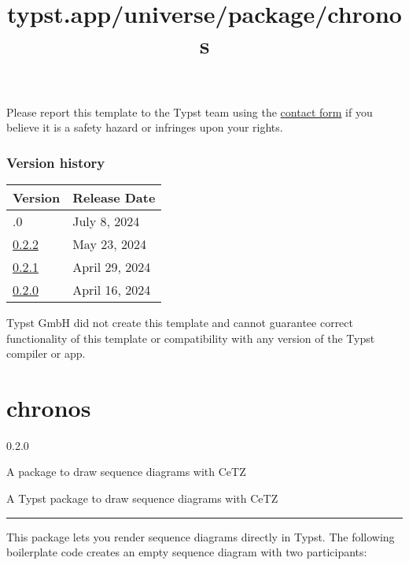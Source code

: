 Please report this template to the Typst team using the
\href{https://typst.app/contact}{contact form} if you believe it is a
safety hazard or infringes upon your rights.

\label{versions}
\subsubsection{Version history}\label{version-history}

\begin{longtable}[]{@{}ll@{}}
\toprule\noalign{}
Version & Release Date \\
\midrule\noalign{}
\endhead
\bottomrule\noalign{}
\endlastfoot
0.3.0 & July 8, 2024 \\
\href{https://typst.app/universe/package/cheda-seu-thesis/0.2.2/}{0.2.2}
& May 23, 2024 \\
\href{https://typst.app/universe/package/cheda-seu-thesis/0.2.1/}{0.2.1}
& April 29, 2024 \\
\href{https://typst.app/universe/package/cheda-seu-thesis/0.2.0/}{0.2.0}
& April 16, 2024 \\
\end{longtable}

Typst GmbH did not create this template and cannot guarantee correct
functionality of this template or compatibility with any version of the
Typst compiler or app.


\title{typst.app/universe/package/chronos}

\label{banner}
\section{chronos}\label{chronos}

{ 0.2.0 }

A package to draw sequence diagrams with CeTZ

\label{readme}
A Typst package to draw sequence diagrams with CeTZ

\begin{center}\rule{0.5\linewidth}{0.5pt}\end{center}

This package lets you render sequence diagrams directly in Typst. The
following boilerplate code creates an empty sequence diagram with two
participants:

